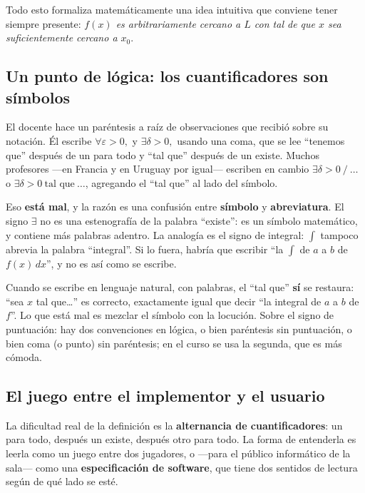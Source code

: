 \documentclass[12pt,a4paper]{article}
\begin{document}
Todo esto formaliza matemáticamente una idea intuitiva que conviene tener
siempre presente: \emph{$f(x)$ es arbitrariamente cercano a $L$ con tal de que
$x$ sea suficientemente cercano a $x_0$}.

\subsection{Un punto de lógica: los cuantificadores son símbolos}

El docente hace un paréntesis a raíz de observaciones que recibió sobre su
notación. Él escribe $\forall \varepsilon > 0,$ y $\exists \delta > 0,$ usando
una coma, que se lee ``tenemos que'' después de un para todo y ``tal que''
después de un existe. Muchos profesores ---en Francia y en Uruguay por igual---
escriben en cambio $\exists \delta > 0 \ /\ \dots$ o
$\exists \delta > 0 \ \text{tal que} \ \dots$, agregando el ``tal que'' al lado
del símbolo.

\begin{notebox}
Eso \textbf{está mal}, y la razón es una confusión entre \textbf{símbolo} y
\textbf{abreviatura}. El signo $\exists$ no es una estenografía de la palabra
``existe'': es un símbolo matemático, y contiene más palabras adentro. La
analogía es el signo de integral: $\int$ tampoco abrevia la palabra
``integral''. Si lo fuera, habría que escribir ``la $\int$ de $a$ a $b$ de
$f(x)\,dx$'', y no es así como se escribe.
\end{notebox}

Cuando se escribe en lenguaje natural, con palabras, el ``tal que'' \textbf{sí}
se restaura: ``sea $x$ tal que\dots'' es correcto, exactamente igual que decir
``la integral de $a$ a $b$ de $f$''. Lo que está mal es mezclar el símbolo con
la locución. Sobre el signo de puntuación: hay dos convenciones en lógica, o
bien paréntesis sin puntuación, o bien coma (o punto) sin paréntesis; en el
curso se usa la segunda, que es más cómoda.

\subsection{El juego entre el implementor y el usuario}

La dificultad real de la definición es la \textbf{alternancia de
cuantificadores}: un para todo, después un existe, después otro para todo. La
forma de entenderla es leerla como un juego entre dos jugadores, o ---para el
público informático de la sala--- como una \textbf{especificación de
software}, que tiene dos sentidos de lectura según de qué lado se esté.
\end{document}
